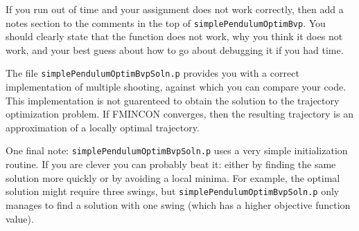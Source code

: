 \par If you run out of time and your assignment does not work correctly,
then add a notes section to the comments in the top of \texttt{simplePendulumOptimBvp}.
You should clearly state that the function does not work, why you think it does
not work, and your best guess about how to go about debugging it if you had time.

\par The file \texttt{simplePendulumOptimBvpSoln.p} provides you with a correct
implementation of multiple shooting, against which you can compare your code.
This implementation is not guarenteed to obtain the  solution to
the trajectory optimization problem. If FMINCON converges, then the resulting
trajectory is an approximation of a locally optimal trajectory.

\par One final note: \texttt{simplePendulumOptimBvpSoln.p} uses a very simple
initialization routine. If you are clever you can probably beat it: either by
finding the same solution more quickly or by avoiding a local minima.
For example, the optimal solution might require three swings,
but \texttt{simplePendulumOptimBvpSoln.p} only manages to find a solution with
one swing (which has a higher objective function value).


